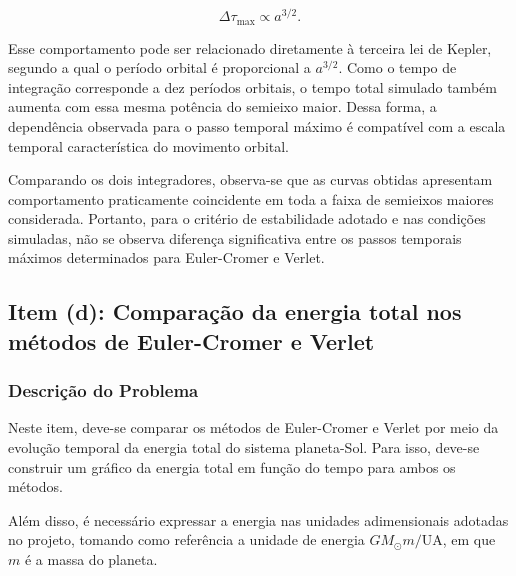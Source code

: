 \documentclass[12pt,a4paper]{article}
\begin{document}
\begin{equation}
    \boxed{\Delta\tau_{\max}\propto a^{3/2}}.
\end{equation}

Esse comportamento pode ser relacionado diretamente
à terceira lei de Kepler, segundo a qual o período
orbital é proporcional a $a^{3/2}$. Como o tempo
de integração corresponde a dez períodos orbitais,
o tempo total simulado também aumenta com essa
mesma potência do semieixo maior. Dessa forma,
a dependência observada para o passo temporal máximo
é compatível com a escala temporal característica
do movimento orbital.

Comparando os dois integradores, observa-se que
as curvas obtidas apresentam comportamento
praticamente coincidente em toda a faixa de
semieixos maiores considerada. Portanto, para
o critério de estabilidade adotado e nas condições
simuladas, não se observa diferença significativa
entre os passos temporais máximos determinados
para Euler-Cromer e Verlet.

\subsection{Item (d): Comparação da energia total nos métodos de Euler-Cromer e Verlet}

\subsubsection{Descrição do Problema}

Neste item, deve-se comparar os métodos de Euler-Cromer e Verlet por meio da evolução temporal da energia total do sistema planeta-Sol. Para isso, deve-se construir um gráfico da energia total em função do tempo para ambos os métodos.

Além disso, é necessário expressar a energia nas unidades adimensionais adotadas no projeto, tomando como referência a unidade de energia $GM_{\odot}m/\mathrm{UA}$, em que $m$ é a massa do planeta.

\end{document}
